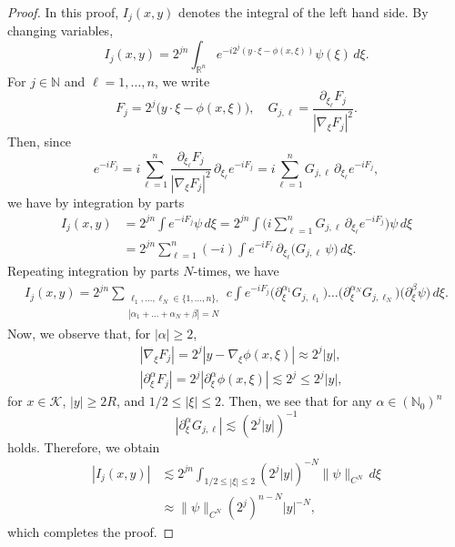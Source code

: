 \documentclass[12pt]{amsart}
\numberwithin{equation}{section}
\theoremstyle{plain}
\theoremstyle{definition}
\newcommand{\N}{\mathbb{N}}
\newcommand{\R}{\mathbb{R}}
\newcommand{\calK}{\mathcal{K}}
\begin{document}
\begin{proof} 
In this proof, 
$I_{j} (x, y)$ denotes
the integral of the left hand side.
By changing variables,
\[
I_{j} (x, y) 
= 2^{j n}
\int_{\R^n} e^{-i 2^{j} ( y \cdot \xi - \phi (x, \xi) )} 
\psi (\xi) \,d\xi .
\]
For $j \in \N$ and $\ell = 1, \dots, n$,
we write
\[
F_{j} %
= 2^{j} \big( y \cdot \xi - \phi (x, \xi) \big),
\quad
G_{j, \ell} %
= \frac{ \partial_{\xi_{ \ell} } F_{j} }{| \nabla_{\xi} F_{j} |^2 } .
\]
Then, since
\[
e^{-i F_{j} } 
= i \sum_{\ell = 1}^{n} 
\frac{ \partial_{\xi_{ \ell} } F_{j} }{| \nabla_{\xi} F_{j} |^2 } \, 
\partial_{\xi_{ \ell} } e^{-i F_{j} } 
= i \sum_{\ell = 1}^{n} 
G_{j, \ell} \, 
\partial_{\xi_{ \ell} } e^{-i F_{j} } ,
\]
we have by integration by parts
\begin{align*}
I_{j} (x, y) 
&= 2^{j n}
\int e^{-i F_{j}} 
\psi \,d\xi 
= 2^{j n} 
\int 
\Big( i \sum_{\ell = 1}^{n} 
G_{j, \ell} \, 
\partial_{\xi_{ \ell} } e^{-i F_{j} } \Big)
\psi \,d\xi
\\&= 2^{j n} \sum_{\ell = 1}^{n} (- i)
\int e^{-i F_{j} } \,
\partial_{\xi_{ \ell} } \big( G_{j, \ell} \, \psi \big)\,d\xi .
\end{align*}
Repeating integration by parts $N$-times,
we have
\begin{align*}
I_{j} (x, y) 
= 
2^{j n} 
\sum_{ \substack { \ell_{1},\dots, \ell_{N} \in \{1, \dots, n \}, \\
|\alpha_{1} + \dots + \alpha_{N} +\beta|=N } }
c
\int e^{-i F_{j} }
\big( \partial_{\xi}^{\alpha_{1}} G_{j, \ell_1} \big) \dots
\big( \partial_{\xi}^{\alpha_{N}} G_{j, \ell_{N}} \big)
\big( \partial_{\xi}^{\beta} \psi \big)
\,d\xi .
\end{align*}
Now, we observe that,
for $|\alpha| \ge 2$,
\begin{align*}&
|\nabla_{\xi} F_{j}| 
= 2^{j} |y-\nabla_{\xi} \phi(x, \xi)| 
\approx 2^{j} |y|,
\\&
| \partial_{\xi}^{\alpha} F_{j} |
= 2^{j} |\partial_{\xi}^{\alpha} \phi (x, \xi) |
\lesssim 2^{j} 
\le 2^{j} |y| ,
\end{align*}
for $x \in \calK$, $|y| \ge 2R$, 
and $1/2 \le |\xi| \le 2$.
Then, we see that
for any
$\alpha \in (\N_{0})^{n}$
\[
| \partial_{\xi}^{\alpha} G_{j, \ell} | 
\lesssim ( 2^{j} |y| )^{-1}
\]
holds.
Therefore, we obtain
\begin{align*}
| I_{j} (x, y) |
&\lesssim 2^{j n} 
\int_{1/2 \le |\xi| \le 2}
( 2^{j} |y| )^{-N}
\| \psi \|_{C^{N}} \,d\xi 
\\&\approx
\|\psi\|_{C^N} (2^j)^{n-N} |y|^{-N} ,
\end{align*}
which completes the proof.
\end{proof}
\end{document}

